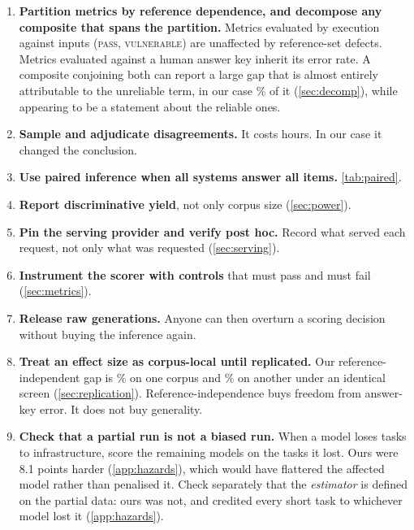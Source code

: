 \documentclass[11pt]{article}
\newcommand{\pass}{\textsc{pass}}
\newcommand{\vuln}{\textsc{vulnerable}}
\begin{document}
\begin{enumerate}
\item \textbf{Partition metrics by reference dependence, and decompose any
composite that spans the partition.} Metrics evaluated by execution against
inputs (\pass{}, \vuln{}) are unaffected by reference-set defects. Metrics
evaluated against a human answer key inherit its error rate. A composite
conjoining both can report a large gap that is almost entirely attributable to
the unreliable term, in our case \equivshare{}\% of it (\cref{sec:decomp}), while
appearing to be a statement about the reliable ones.

\item \textbf{Sample and adjudicate disagreements.} It costs hours. In our
case it changed the conclusion.

\item \textbf{Use paired inference when all systems answer all items.}
\cref{tab:paired}.

\item \textbf{Report discriminative yield}, not only corpus size
(\cref{sec:power}).

\item \textbf{Pin the serving provider and verify post hoc.} Record what
served each request, not only what was requested (\cref{sec:serving}).

\item \textbf{Instrument the scorer with controls} that must pass and must
fail (\cref{sec:metrics}).

\item \textbf{Release raw generations.} Anyone can then overturn a scoring
decision without buying the inference again.

\item \textbf{Treat an effect size as corpus-local until replicated.} Our
reference-independent gap is \vulngivencorrect{}\% on one corpus and
\srvulngivencorrect{}\% on another under
an identical screen (\cref{sec:replication}). Reference-independence buys
freedom from answer-key error. It does not buy generality.

\item \textbf{Check that a partial run is not a biased run.} When a model
loses tasks to infrastructure, score the remaining models on the tasks it
lost. Ours were 8.1 points harder (\cref{app:hazards}), which would have
flattered the affected model rather than penalised it. Check separately that
the \emph{estimator} is defined on the partial data: ours was not, and
credited every short task to whichever model lost it (\cref{app:hazards}).


\end{enumerate}
\end{document}
